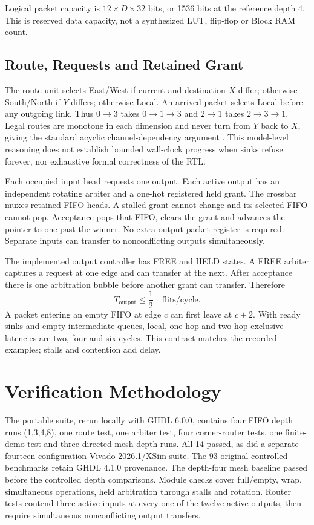 \documentclass[conference,a4paper]{IEEEtran}
\begin{document}
Logical packet capacity is $12\times D\times 32$ bits, or 1536 bits at the reference depth 4. This is reserved data capacity, not a synthesized LUT, flip-flop or Block RAM count.
\subsection{Route, Requests and Retained Grant}
The route unit selects East/West if current and destination $X$ differ; otherwise South/North if $Y$ differs; otherwise Local. An arrived packet selects Local before any outgoing link. Thus $0\to3$ takes $0\to1\to3$ and $2\to1$ takes $2\to3\to1$. Legal routes are monotone in each dimension and never turn from $Y$ back to $X$, giving the standard acyclic channel-dependency argument \cite{dally1987}. This model-level reasoning does not establish bounded wall-clock progress when sinks refuse forever, nor exhaustive formal correctness of the RTL.

Each occupied input head requests one output. Each active output has an independent rotating arbiter and a one-hot registered held grant. The crossbar muxes retained FIFO heads. A stalled grant cannot change and its selected FIFO cannot pop. Acceptance pops that FIFO, clears the grant and advances the pointer to one past the winner. No extra output packet register is required. Separate inputs can transfer to nonconflicting outputs simultaneously.

The implemented output controller has FREE and HELD states. A FREE arbiter captures a request at one edge and can transfer at the next. After acceptance there is one arbitration bubble before another grant can transfer. Therefore
\begin{equation}
T_{\mathrm{output}}\leq \frac{1}{2}\quad\text{flits/cycle}.
\end{equation}
A packet entering an empty FIFO at edge $c$ can first leave at $c+2$. With ready sinks and empty intermediate queues, local, one-hop and two-hop exclusive latencies are two, four and six cycles. This contract matches the recorded examples; stalls and contention add delay.
\section{Verification Methodology}
The portable suite, rerun locally with GHDL 6.0.0, contains four FIFO depth runs (1,3,4,8), one route test, one arbiter test, four corner-router tests, one finite-demo test and three directed mesh depth runs. All 14 passed, as did a separate fourteen-configuration Vivado 2026.1/XSim suite. The 93 original controlled benchmarks retain GHDL 4.1.0 provenance. The depth-four mesh baseline passed before the controlled depth comparisons. Module checks cover full/empty, wrap, simultaneous operations, held arbitration through stalls and rotation. Router tests contend three active inputs at every one of the twelve active outputs, then require simultaneous nonconflicting output transfers.
\end{document}
